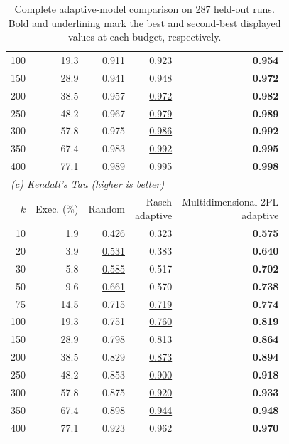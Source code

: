 \begin{table}[t]
\begin{tabular}{rrrrr}
    100 & 19.3 & 0.911 & \underline{0.923} & \textbf{0.954} \\
    150 & 28.9 & 0.941 & \underline{0.948} & \textbf{0.972} \\
    200 & 38.5 & 0.957 & \underline{0.972} & \textbf{0.982} \\
    250 & 48.2 & 0.967 & \underline{0.979} & \textbf{0.989} \\
    300 & 57.8 & 0.975 & \underline{0.986} & \textbf{0.992} \\
    350 & 67.4 & 0.983 & \underline{0.992} & \textbf{0.995} \\
    400 & 77.1 & 0.989 & \underline{0.995} & \textbf{0.998} \\
    \midrule
    \multicolumn{5}{l}{\textit{(c) Kendall's Tau (higher is better)}} \\
    $k$ & Exec. (\%) & Random & \shortstack{Rasch\\adaptive} & \shortstack{Multidimensional 2PL\\adaptive} \\
    \midrule
    10 & 1.9 & \underline{0.426} & 0.323 & \textbf{0.575} \\
    20 & 3.9 & \underline{0.531} & 0.383 & \textbf{0.640} \\
    30 & 5.8 & \underline{0.585} & 0.517 & \textbf{0.702} \\
    50 & 9.6 & \underline{0.661} & 0.570 & \textbf{0.738} \\
    75 & 14.5 & 0.715 & \underline{0.719} & \textbf{0.774} \\
    100 & 19.3 & 0.751 & \underline{0.760} & \textbf{0.819} \\
    150 & 28.9 & 0.798 & \underline{0.813} & \textbf{0.864} \\
    200 & 38.5 & 0.829 & \underline{0.873} & \textbf{0.894} \\
    250 & 48.2 & 0.853 & \underline{0.900} & \textbf{0.918} \\
    300 & 57.8 & 0.875 & \underline{0.920} & \textbf{0.933} \\
    350 & 67.4 & 0.898 & \underline{0.944} & \textbf{0.948} \\
    400 & 77.1 & 0.923 & \underline{0.962} & \textbf{0.970} \\
    \bottomrule
  \end{tabular}
  \caption{Complete adaptive-model comparison on 287 held-out runs. Bold and underlining mark the best and second-best displayed values at each budget, respectively.}
  \label{tab:adaptive-model-complete}
\end{table}
